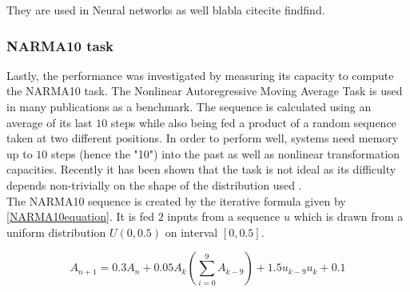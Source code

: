 	They are used in Neural networks as well blabla citecite findfind. 
	\cite{VOELKER Legendre Memory Units: Continuous-TimeRepresentation in Recurrent Neural Networks}
		
		
		
	
	

\subsubsection{NARMA10 task}
	Lastly, the performance was investigated by measuring its capacity to compute the NARMA10 task. The Nonlinear Autoregressive Moving Average Task \cite{HER12} is used in many publications as a benchmark. The sequence is calculated using an average of its last $10$ steps while also being fed a product of a random sequence taken at two different positions. In order to perform well, systems need memory up to $10$ steps (hence the "10") into the past as well as nonlinear transformation capacities. Recently it has been shown that the task is not ideal as its difficulty depends non-trivially on the shape of the distribution used \cite{KUBOTA_Arxive}. \\
	The NARMA10 sequence is created by the iterative formula given by \ref{NARMA10equation}. It is fed $2$ inputs from a sequence $u$ which is drawn from a uniform distribution $U(0,0.5)$ on interval $\left[0,0.5\right]$.
	
	\begin{equation}
		A_{n+1} = 0.3 A_{n} + 0.05 A_{k}\left( \sum_{i=0}^{9} A_{k-9} \right) +1.5 u_{k-9} u_{k} + 0.1
		\label{NARMA10equation}
	\end{equation}


	

